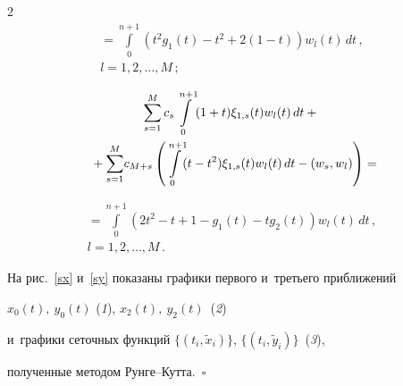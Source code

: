 \begin{multicols}{2}
\begin{multline*}
{}=\!\int\limits_0^{n+1}\!\left(t^2g_1(t)-t^2+2(1-t)\right)w_l(t)\,dt\,,\\


 l=1,2,\dots,M\,;


\end{multline*}





\vspace*{-12pt}





\noindent


\begin{multline*}


\sum\limits_{s=1}^M c_s\int\limits_{0}^{n+1}(1+t){\xi}_{1,s}(t)w_l(t)\,dt+{}\\


{}+


\sum\limits_{s=1}^M \!c_{M+s}\left(\int\limits_0^{n+1}\!(t-t^2){\xi}_{1,s}(t)w_l(t)\,dt-


\left(w_s,w_l\right)\right)={}\hspace*{-6.37675pt}


\end{multline*}








\noindent


\begin{multline*}


{}=\int\limits_0^{n+1}(2t^2-t+1-g_1(t)-tg_2(t))w_l(t)\,dt\,, 


\\


 l=1,2,\dots,M\,.


\end{multline*}








На рис.~\ref{sx} и~\ref{sy} показаны графики первого и~треть\-его приближений 


$x_0(t),~y_0(t)$ (\textit{1}), $x_2(t),~y_2(t)$~(\textit{2}) 


и~графики сеточных функций $\{(t_i,\tilde{x}_i)\}$, $\{(t_i,\tilde{y}_i)\}$~(\textit{3}), 


полученные методом Рун\-ге--Кутта.~\hfill$\square$





\vspace*{-6pt}






\end{multicols}
